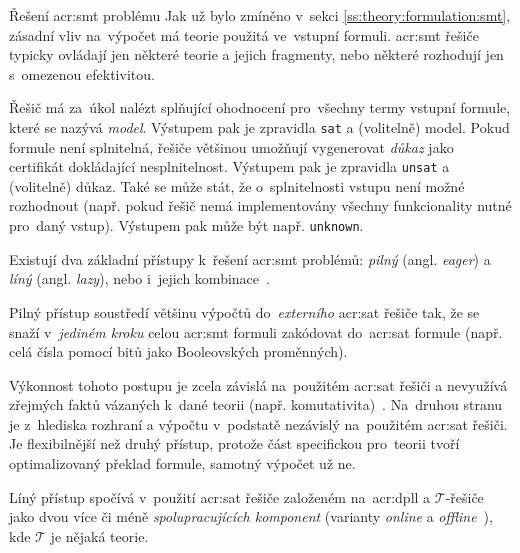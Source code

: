 \documentclass[thesis=M,czech]{FITthesis}[2012/06/26]
\newcommand{\acrlabel}[1]{acr:#1}
\newcommand{\acr}[1]{\acrshort{\acrlabel{#1}}}
\newcommand{\id}[1]{\texttt{#1}}
\newcommand{\hl}[1]{\textit{#1}}
\newcommand{\name}[1]{\hl{#1}}
\newcommand{\cit}[1]{\cite{#1}}
\newcommand{\rf}[1]{\ref{#1}}
\newcommand{\set}[1]{\ensuremath{\mathcal{#1}}}
\begin{document}

\begin{section}{Řešení \acr{smt} problému}\label{s:search:smt}
Jak už bylo zmíněno v~sekci \rf{ss:theory:formulation:smt},
zásadní vliv na~výpočet má teorie použitá ve~vstupní formuli.
\acr{smt} řešiče typicky ovládají jen některé teorie
a jejich fragmenty, nebo některé rozhodují jen s~omezenou efektivitou.

Řešič má za~úkol nalézt splňující ohodnocení
pro~všechny termy vstupní formule,
které se nazývá \name{model}.
Výstupem pak je zpravidla \id{sat} a (volitelně) model.
Pokud formule není splnitelná,
řešiče většinou umožňují vygenerovat
\hl{důkaz} jako certifikát dokládající nesplnitelnost.
Výstupem pak je zpravidla \id{unsat}
a (volitelně) důkaz.
Také se může stát,
že o~splnitelnosti vstupu není možné rozhodnout
(např. pokud řešič nemá implementovány
všechny funkcionality nutné pro~daný vstup).
Výstupem pak může být např. \id{unknown}.

Existují dva základní přístupy k~řešení \acr{smt} problémů:
\name{pilný} (angl. \name{eager}) a \name{líný} (angl. \name{lazy}),
nebo i~jejich kombinace~\cit{smt-stanford}.


\begin{paragraph}{Pilný přístup}\label{p:search:smt:eager}
soustředí většinu výpočtů
do~\hl{externího} \acr{sat} řešiče tak,
že se snaží v~\hl{jediném kroku} celou \acr{smt} formuli zakódovat
do~\acr{sat} formule (např. celá čísla pomocí bitů
jako Booleovských proměnných).

Výkonnost tohoto postupu je zcela závislá na~použitém \acr{sat} řešiči
a nevyužívá zřejmých faktů vázaných k~dané teorii
(např. komutativita)~\cit{smt}.
Na~druhou stranu je z~hlediska rozhraní a výpočtu
v~podstatě nezávislý na~použitém \acr{sat} řešiči.
Je flexibilnější než druhý přístup,
protože část specifickou pro~teorii tvoří 
optimalizovaný překlad formule,
samotný výpočet už ne.
\end{paragraph} %


\begin{paragraph}{Líný přístup}\label{p:search:smt:lazy}
spočívá v~použití \acr{sat} řešiče
založeném na~\acr{dpll}
a \set{T}-řešiče
jako dvou více či méně \hl{spolupracujících komponent}
(varianty \name{online} a \name{offline}~\cit{smt-stanford}),
kde \set{T} je nějaká teorie.


\end{paragraph}
\end{section}
\end{document}
